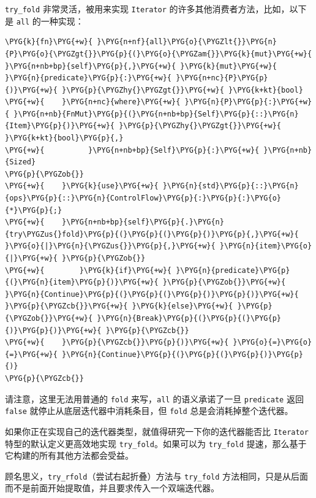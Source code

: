 \texttt{try\_fold} 非常灵活，被用来实现 \texttt{Iterator} 的许多其他消费者方法，比如，以下是 \texttt{all} 的一种实现：

\begin{Verbatim}[commandchars=\\\{\},breaklines=true,breakanywhere=true,fontsize=\codefont,xleftmargin=17bp]
\PYG{k}{fn}\PYG{+w}{ }\PYG{n+nf}{all}\PYG{o}{\PYGZlt{}}\PYG{n}{P}\PYG{o}{\PYGZgt{}}\PYG{p}{(}\PYG{o}{\PYGZam{}}\PYG{k}{mut}\PYG{+w}{ }\PYG{n+nb+bp}{self}\PYG{p}{,}\PYG{+w}{ }\PYG{k}{mut}\PYG{+w}{ }\PYG{n}{predicate}\PYG{p}{:}\PYG{+w}{ }\PYG{n+nc}{P}\PYG{p}{)}\PYG{+w}{ }\PYG{p}{\PYGZhy{}\PYGZgt{}}\PYG{+w}{ }\PYG{k+kt}{bool}
\PYG{+w}{    }\PYG{n+nc}{where}\PYG{+w}{ }\PYG{n}{P}\PYG{p}{:}\PYG{+w}{ }\PYG{n+nb}{FnMut}\PYG{p}{(}\PYG{n+nb+bp}{Self}\PYG{p}{::}\PYG{n}{Item}\PYG{p}{)}\PYG{+w}{ }\PYG{p}{\PYGZhy{}\PYGZgt{}}\PYG{+w}{ }\PYG{k+kt}{bool}\PYG{p}{,}
\PYG{+w}{          }\PYG{n+nb+bp}{Self}\PYG{p}{:}\PYG{+w}{ }\PYG{n+nb}{Sized}
\PYG{p}{\PYGZob{}}
\PYG{+w}{    }\PYG{k}{use}\PYG{+w}{ }\PYG{n}{std}\PYG{p}{::}\PYG{n}{ops}\PYG{p}{::}\PYG{n}{ControlFlow}\PYG{p}{:}\PYG{p}{:}\PYG{o}{*}\PYG{p}{;}
\PYG{+w}{    }\PYG{n+nb+bp}{self}\PYG{p}{.}\PYG{n}{try\PYGZus{}fold}\PYG{p}{(}\PYG{p}{(}\PYG{p}{)}\PYG{p}{,}\PYG{+w}{ }\PYG{o}{|}\PYG{n}{\PYGZus{}}\PYG{p}{,}\PYG{+w}{ }\PYG{n}{item}\PYG{o}{|}\PYG{+w}{ }\PYG{p}{\PYGZob{}}
\PYG{+w}{        }\PYG{k}{if}\PYG{+w}{ }\PYG{n}{predicate}\PYG{p}{(}\PYG{n}{item}\PYG{p}{)}\PYG{+w}{ }\PYG{p}{\PYGZob{}}\PYG{+w}{ }\PYG{n}{Continue}\PYG{p}{(}\PYG{p}{(}\PYG{p}{)}\PYG{p}{)}\PYG{+w}{ }\PYG{p}{\PYGZcb{}}\PYG{+w}{ }\PYG{k}{else}\PYG{+w}{ }\PYG{p}{\PYGZob{}}\PYG{+w}{ }\PYG{n}{Break}\PYG{p}{(}\PYG{p}{(}\PYG{p}{)}\PYG{p}{)}\PYG{+w}{ }\PYG{p}{\PYGZcb{}}
\PYG{+w}{    }\PYG{p}{\PYGZcb{}}\PYG{p}{)}\PYG{+w}{ }\PYG{o}{=}\PYG{o}{=}\PYG{+w}{ }\PYG{n}{Continue}\PYG{p}{(}\PYG{p}{(}\PYG{p}{)}\PYG{p}{)}
\PYG{p}{\PYGZcb{}}
\end{Verbatim}

请注意，这里无法用普通的 \texttt{fold} 来写，\texttt{all} 的语义承诺了一旦 \texttt{predicate} 返回 \texttt{false} 就停止从底层迭代器中消耗条目，但 \texttt{fold} 总是会消耗掉整个迭代器。

如果你正在实现自己的迭代器类型，就值得研究一下你的迭代器能否比 \texttt{Iterator} 特型的默认定义更高效地实现 \texttt{try\_fold}。如果可以为 \texttt{try\_fold} 提速，那么基于它构建的所有其他方法都会受益。

顾名思义，\texttt{try\_rfold}（尝试右起折叠）方法与 \texttt{try\_fold} 方法相同，只是从后面而不是前面开始提取值，并且要求传入一个双端迭代器。

